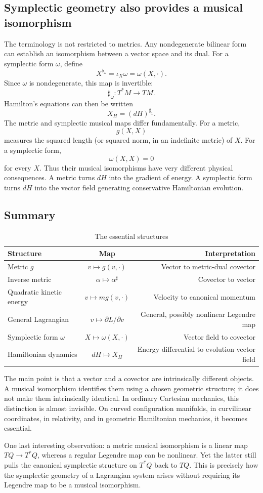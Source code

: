 \subsection{ Symplectic geometry also provides a musical isomorphism}
The terminology is not restricted to metrics.
Any nondegenerate bilinear form can establish an isomorphism between a vector
space and its dual.
For a symplectic form \(\omega\), define
\[
\boxed{
X^{\flat_\omega}=\iota_X\omega=\omega(X,\cdot).
}
\]
Since \(\omega\) is nondegenerate, this map is invertible:
\[
\sharp_\omega:T^*M\longrightarrow TM.
\]
Hamilton's equations can then be written
\[
\boxed{
X_H=(dH)^{\sharp_\omega}.
}
\]
The metric and symplectic musical maps differ fundamentally.
For a metric,
\[
g(X,X)
\]
measures the squared length (or squared norm, in an indefinite metric) of \(X\).
For a symplectic form,
\[
\omega(X,X)=0
\]
for every \(X\).
Thus their musical isomorphisms have very different physical consequences.
A metric turns \(dH\) into the gradient of energy. A symplectic form turns
\(dH\) into the vector field generating conservative Hamiltonian evolution.

\subsection{Summary}
\begin{table}[h]
    \caption{The essential structures}
    \begin{tabular}{lcr}
        \toprule
        Structure &	Map	&Interpretation\\
        \midrule
        Metric \(g\)&	\(v\mapsto g(v,\cdot)\)	&Vector to metric-dual covector\\
        Inverse metric &	\(\alpha\mapsto\alpha^\sharp\)	&Covector to vector\\
        Quadratic kinetic energy &	\(v\mapsto mg(v,\cdot)\) &	Velocity to canonical momentum\\
        General Lagrangian	&\(v\mapsto\partial L/\partial v\)	&General, possibly nonlinear Legendre map\\
        Symplectic form \(\omega\)&	\(X\mapsto\omega(X,\cdot)\)	&Vector field to covector\\
        Hamiltonian dynamics&	\(dH\mapsto X_H\)&	Energy differential to evolution vector field\\
\bottomrule
    \end{tabular}
\end{table}
The main point is that a vector and a covector are intrinsically different
objects. A musical isomorphism identifies them using a chosen geometric
structure; it does not make them intrinsically identical.
In ordinary Cartesian mechanics, this distinction is almost invisible. On
curved configuration manifolds, in curvilinear coordinates, in relativity, and
in geometric Hamiltonian mechanics, it becomes essential.

One last interesting observation: a metric musical isomorphism is a linear map
\(TQ\to T^*Q\), whereas a regular Legendre map can be nonlinear. Yet the latter
still pulls the canonical symplectic structure on \(T^*Q\) back to \(TQ\). This
is precisely how the symplectic geometry of a Lagrangian system arises without
requiring its Legendre map to be a musical isomorphism.
